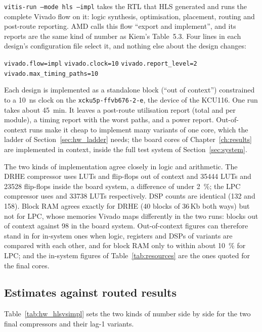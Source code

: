 \texttt{vitis-run --mode hls --impl} takes the RTL that HLS generated and runs
the complete Vivado flow on it: logic synthesis, optimisation, placement,
routing and post-route reporting. AMD calls this flow ``export and implement'',
and its reports are the same kind of number as Kiem's Table~5.3. Four lines in
each design's configuration file select it, and nothing else about the design
changes:
\begin{center}
\small
\texttt{vivado.flow=impl}\qquad
\texttt{vivado.clock=10}\qquad
\texttt{vivado.report\_level=2}\qquad
\texttt{vivado.max\_timing\_paths=10}
\end{center}
Each design is implemented as a standalone block (``out of context'')
constrained to a \SI{10}{\nano\second} clock on the
\texttt{xcku5p-ffvb676-2-e}, the device of the KCU116. One run takes about
\SI{45}{\minute}. It leaves a post-route utilisation report (total and per
module), a timing report with the worst paths, and a power report. Out-of-context
runs make it cheap to implement many variants of one core, which the ladder of
Section~\ref{sec:hw_ladder} needs; the board cores of
Chapter~\ref{ch:results} are implemented in context, inside the full test
system of Section~\ref{sec:system}.

The two kinds of implementation agree closely in logic and arithmetic. The
DRHE compressor uses  LUTs and  flip-flops out of
context and \num{35444} LUTs and \num{23528} flip-flops inside the board
system, a difference of under \SI{2}{\percent}; the LPC compressor uses
 and \num{33738} LUTs respectively. DSP counts are identical
(132 and 158). Block RAM agrees exactly for DRHE (40 blocks of 36\,Kb both
ways) but not for LPC, whose memories Vivado maps differently in the two runs:
 blocks out of context against 98 in the board system.
Out-of-context figures can therefore stand in for in-system ones when logic,
registers and DSPs of variants are compared with each other, and for block RAM
only to within about \SI{10}{\percent} for LPC; and the in-system figures of
Table~\ref{tab:resources} are the ones quoted for the final cores.

\subsection{Estimates against routed results}

Table~\ref{tab:hw_hlsvsimpl} sets the two kinds of number side by side for the
two final compressors and their lag-1 variants.

